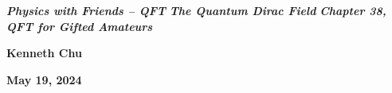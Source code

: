 \documentclass[aspectratio=169,handout]{beamer}
\begin{document}
\addtocounter{framenumber}{-1}

\begin{frame}[plain]


\begin{center}

\vskip 2.0cm
\textbf{\fontsize{16}{18}\selectfont\itshape Physics with Friends -- QFT}
\vskip 0.40cm
\textbf{\fontsize{31}{32}\selectfont\itshape The Quantum Dirac Field}
\vskip 0.35cm
\textbf{\fontsize{16}{18}\selectfont\itshape Chapter 38, QFT for Gifted Amateurs}

\vskip 1.0cm
\textbf{\Large Kenneth Chu}

\vskip 0.5cm
\textbf{May 19, 2024}

\end{center}

\end{frame}


%





\appendix

\tiny


\normalsize

\end{document}
